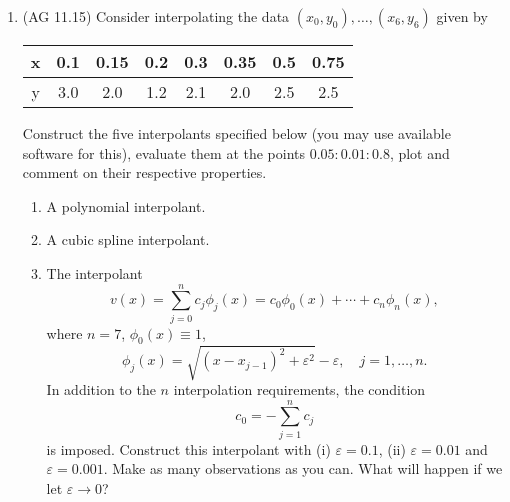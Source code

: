 \documentclass[11pt]{article}
\begin{document}
\begin{enumerate}
\item (AG 11.15)
Consider interpolating the data $(x_0,y_0), \ldots , (x_6,y_6)$
given by
\begin{center}
          \begin{tabular}{|c|c|c|c|c|c|c|c|}
            x & 0.1 & 0.15 & 0.2 & 0.3 & 0.35 & 0.5 & 0.75 \\ \hline
            y & 3.0 & 2.0 &  1.2 & 2.1 & 2.0  & 2.5 & 2.5
          \end{tabular}
\end{center}
Construct the five interpolants specified below (you may use available software for this),
evaluate them at the points $0.05:0.01:0.8$, plot and comment
on their respective properties.
\begin{enumerate}
\item A polynomial interpolant.
\item A cubic spline interpolant.
\item The interpolant
\[   v(x) = \sum_{j=0}^n c_j \phi_j(x) = c_0 \phi_0(x) + \cdots + c_n
  \phi_n(x), \]
where $n = 7$, $\phi_0(x) \equiv 1$, 
\[ \phi_j (x) = \sqrt{ (x-x_{j-1})^2 + \varepsilon^2} - \varepsilon,
\quad j = 1, \ldots , n. \]
In addition to the $n$ interpolation requirements, the condition
\[ c_0 = -\sum_{j=1}^n c_j \]
is imposed.
Construct this interpolant with (i) $\varepsilon = 0.1$, (ii) $\varepsilon = 0.01$
and $\varepsilon = 0.001$.
Make as many observations as you can.
What will happen if we let $\varepsilon \rightarrow 0$? 
\end{enumerate}

 \end{enumerate}
\end{document}

